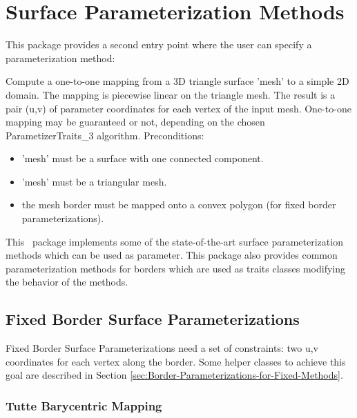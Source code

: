 \section{Surface Parameterization Methods}


This package provides a second  entry point
where the user can specify a parameterization method:

{
Compute a one-to-one mapping from a 3D triangle surface 'mesh' to a simple 2D domain. The mapping is piecewise linear on the triangle mesh. The result is a pair (u,v) of parameter coordinates for each vertex of the input mesh.
One-to-one mapping may be guaranteed or not, depending on the chosen ParametizerTraits\_3 algorithm.
Preconditions:\begin{itemize}
\item 'mesh' must be a surface with one connected component.\item 'mesh' must be a triangular mesh.\item the mesh border must be mapped onto a convex polygon (for fixed border parameterizations).\end{itemize}
}


This \cgal\ package implements some of the state-of-the-art surface
parameterization methods which can be used as
 parameter. This package also provides common parameterization methods for
borders which are used as traits classes modifying the behavior of
the  methods.


\subsection{Fixed Border Surface Parameterizations}


Fixed Border Surface Parameterizations need a set of constraints: two
u,v coordinates for each vertex along the border. Some helper
classes to achieve this goal are described in Section
\ref{sec:Border-Parameterizations-for-Fixed-Methods}.

\subsubsection{Tutte Barycentric Mapping}

